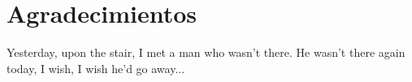 \chapter*{Agradecimientos}

Yesterday, upon the stair,
I met a man who wasn't there.
He wasn't there again today,
I wish, I wish he'd go away...
